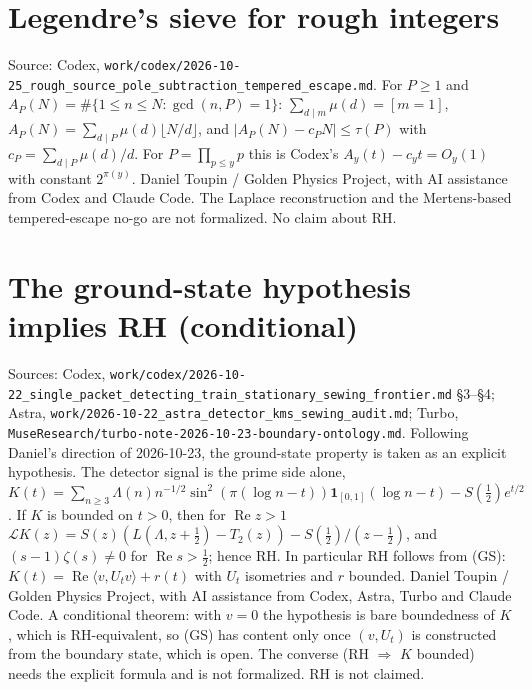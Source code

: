 \documentclass{report}
\theoremstyle{definition}
\begin{document}
\begin{itemize}
\begin{itemize}
\section{Legendre's sieve for rough integers}
Source: Codex, \texttt{work/codex/2026-10-25\_rough\_source\_pole\_subtraction\_tempered\_escape.md}. For $P\ge1$ and $A_P(N)=\#\{1\le n\le N:\gcd(n,P)=1\}$:
$\sum_{d\mid m}\mu(d)=[m=1]$, $A_P(N)=\sum_{d\mid P}\mu(d)\lfloor N/d\rfloor$, and $|A_P(N)-c_PN|\le\tau(P)$ with $c_P=\sum_{d\mid P}\mu(d)/d$. For $P=\prod_{p\le y}p$ this is
Codex's $A_y(t)-c_yt=O_y(1)$ with constant $2^{\pi(y)}$. Daniel Toupin / Golden Physics Project, with AI assistance from Codex and Claude Code. The Laplace
reconstruction and the Mertens-based tempered-escape no-go are not formalized. No claim about RH.

\section{The ground-state hypothesis implies RH (conditional)}
Sources: Codex, \texttt{work/codex/2026-10-22\_single\_packet\_detecting\_train\_stationary\_sewing\_frontier.md} \S3--\S4; Astra,
\texttt{work/2026-10-22\_astra\_detector\_kms\_sewing\_audit.md}; Turbo, \texttt{MuseResearch/turbo-note-2026-10-23-boundary-ontology.md}. Following Daniel's
direction of 2026-10-23, the ground-state property is taken as an explicit hypothesis. The detector signal is the prime side alone,
$K(t)=\sum_{n\ge3}\Lambda(n)n^{-1/2}\sin^2(\pi(\log n-t))\mathbf 1_{[0,1]}(\log n-t)-S(\tfrac12)e^{t/2}$. If $K$ is bounded on $t>0$, then for $\operatorname{Re}z>1$
$\mathcal LK(z)=S(z)(L(\Lambda,z+\tfrac12)-T_2(z))-S(\tfrac12)/(z-\tfrac12)$, and $(s-1)\zeta(s)\ne0$ for $\operatorname{Re}s>\tfrac12$; hence RH. In particular RH follows from
(GS): $K(t)=\operatorname{Re}\langle v,U_tv\rangle+r(t)$ with $U_t$ isometries and $r$ bounded. Daniel Toupin / Golden Physics Project, with AI assistance from
Codex, Astra, Turbo and Claude Code. A conditional theorem: with $v=0$ the hypothesis is bare boundedness of $K$, which is RH-equivalent, so (GS) has
content only once $(v,U_t)$ is constructed from the boundary state, which is open. The converse (RH $\Rightarrow$ $K$ bounded) needs the explicit formula and is
not formalized. RH is not claimed.



\end{itemize}
\end{itemize}
\end{document}
